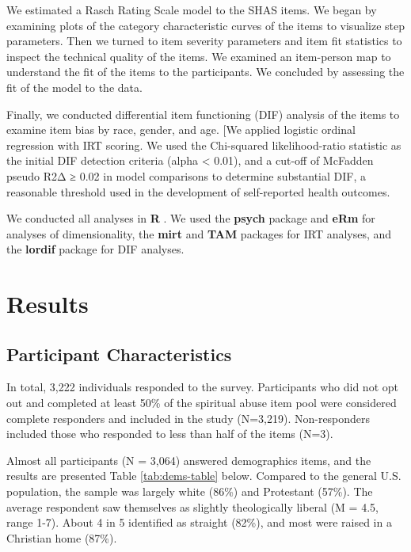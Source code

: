 \documentclass[
]{article}
\begin{document}
We estimated a Rasch Rating Scale model to the SHAS items. We began by examining plots of the category characteristic curves of the items to visualize step parameters. Then we turned to item severity parameters and item fit statistics to inspect the technical quality of the items. We examined an item-person map to understand the fit of the items to the participants. We concluded by assessing the fit of the model to the data.

Finally, we conducted differential item functioning (DIF) analysis of the items to examine item bias by race, gender, and age. {[}We applied logistic ordinal regression with IRT scoring. We used the Chi-squared likelihood-ratio statistic as the initial DIF detection criteria (alpha \textless{} 0.01), and a cut-off of McFadden pseudo R2Δ ≥ 0.02 in model comparisons to determine substantial DIF, a reasonable threshold used in the development of self-reported health outcomes.

We conducted all analyses in \textbf{R} \citep{R-base}. We used the \textbf{psych} package \citep{R-psych} and \textbf{eRm} \citep{R-eRm} for analyses of dimensionality, the \textbf{mirt} \citep{R-mirt} and \textbf{TAM} \citep{R-TAM} packages for IRT analyses, and the \textbf{lordif} \citep{R-lordif} package for DIF analyses.

\hypertarget{results}{%
\section{Results}\label{results}}

\hypertarget{participant-characteristics}{%
\subsection{Participant Characteristics}\label{participant-characteristics}}

In total, 3,222 individuals responded to the survey. Participants who did not opt out and completed at least 50\% of the spiritual abuse item pool were considered complete responders and included in the study (N=3,219). Non-responders included those who responded to less than half of the items (N=3).

Almost all participants (N = 3,064) answered demographics items, and the results are presented Table \ref{tab:dems-table} below. Compared to the general U.S. population, the sample was largely white (86\%) and Protestant (57\%). The average respondent saw themselves as slightly theologically liberal (M = 4.5, range 1-7). About 4 in 5 identified as straight (82\%), and most were raised in a Christian home (87\%).
\end{document}
